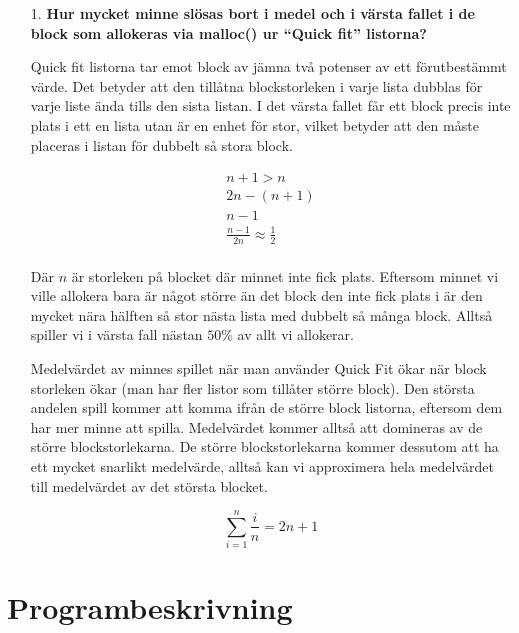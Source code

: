 \documentclass[a4paper,10pt,titlepage]{article}
\begin{document}
\begin{enumerate}
\item[1.] \textbf{\footnotesize Hur mycket minne slösas bort i medel och i värsta fallet i de block som allokeras via malloc() ur ``Quick fit'' listorna?}

Quick fit listorna tar emot block av jämna två potenser av ett
förutbestämmt värde. Det betyder att den tillåtna blockstorleken i
varje lista dubblas för varje liste ända tills den sista listan. I
det värsta fallet får ett block precis inte plats i ett en lista utan är en
enhet för stor, vilket betyder att den måste placeras i listan för dubbelt så
stora block.

\begin{equation*}
\begin{array}{c}
n+1 > n\\
2n - (n+1)\\
n-1\\
\frac{n-1}{2n} \approx \frac{1}{2}\\
\end{array}
\end{equation*}

Där $n$ är storleken på blocket där minnet inte fick plats.
Eftersom minnet vi ville allokera bara är något större än det block den inte
fick plats i är den mycket nära hälften så stor nästa lista med dubbelt så många
block. Alltså spiller vi i värsta fall nästan $50\%$ av allt vi allokerar.

Medelvärdet av minnes spillet när man använder Quick Fit ökar när block
storleken ökar (man har fler listor som tillåter större block). Den största
andelen spill kommer att komma ifrån de större block listorna, eftersom dem har
mer minne att spilla. Medelvärdet kommer alltså att domineras av de större
blockstorlekarna. De större blockstorlekarna kommer dessutom att ha ett mycket
snarlikt medelvärde, alltså kan vi approximera hela medelvärdet till medelvärdet
av det största blocket.

\begin{equation*}
\sum^n_{i=1}\frac{i}{n} = 2n + 1
\end{equation*}

\end{enumerate}

\newpage
\section{Programbeskrivning}
\end{document}

